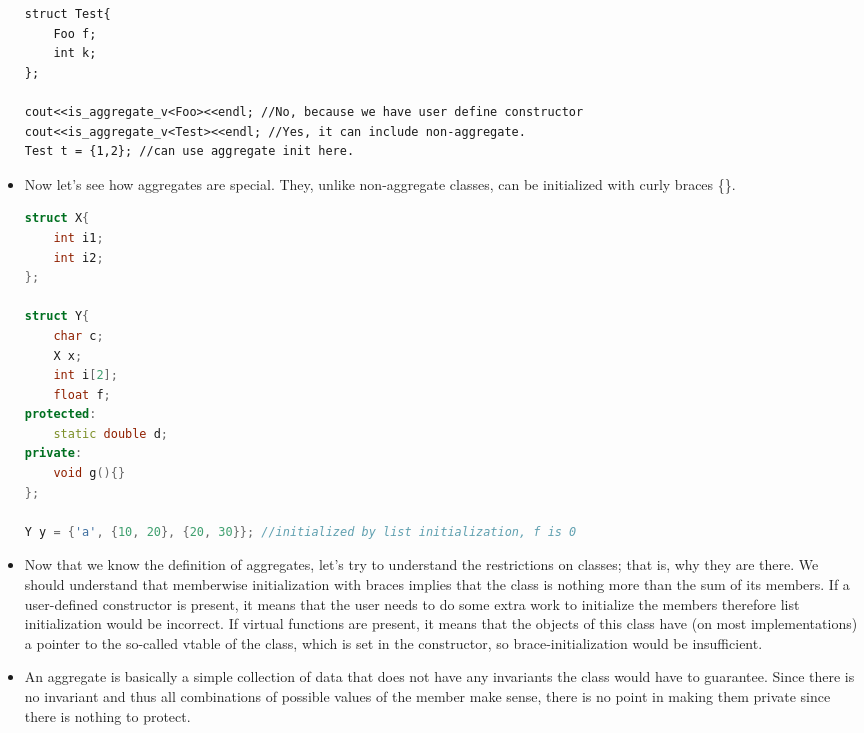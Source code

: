 \documentclass[a4paper,11pt,twoside]{book}
\begin{document}
\begin{itemize}
\begin{lstlisting}[]
struct Test{
    Foo f;
    int k;
};

cout<<is_aggregate_v<Foo><<endl; //No, because we have user define constructor
cout<<is_aggregate_v<Test><<endl; //Yes, it can include non-aggregate.
Test t = {1,2}; //can use aggregate init here.
\end{lstlisting}

	\item Now let's see how aggregates are special. They, unlike non-aggregate classes, can be initialized with curly braces \{\}. 
\begin{lstlisting}[frame=single, language=c++]
struct X{
	int i1;
	int i2;
};
	
struct Y{
	char c;
	X x;
	int i[2];
	float f; 
protected:
	static double d;
private:
	void g(){}      
}; 
	
Y y = {'a', {10, 20}, {20, 30}}; //initialized by list initialization, f is 0
\end{lstlisting}
	
	\item Now that we know the definition of aggregates, let's try to understand the restrictions on classes; that is, why they are there. We should understand that memberwise initialization with braces implies that the class is nothing more than the sum of its members. If a user-defined constructor is present, it means that the user needs to do some extra work to initialize the members therefore list initialization would be incorrect. If virtual functions are present, it means that the objects of this class have (on most implementations) a pointer to the so-called vtable of the class, which is set in the constructor, so brace-initialization would be insufficient. 
	
	\item An aggregate is basically a simple collection of data that does not have any invariants the class would have to guarantee. Since there is no invariant and thus all combinations of possible values of the member make sense, there is no point in making them private since there is nothing to protect.
	
\end{itemize}
\end{document}
